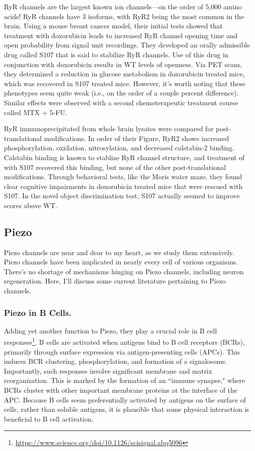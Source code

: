 RyR channels are the largest known ion channels---on the order of 5,000 amino acids! RyR channels have 3 isoforms, with RyR2 being the most common in the brain. Using a mouse breast cancer model, their initial tests showed that treatment with doxorubicin leads to increased RyR channel opening time and open probability from signal unit recordings. They developed an orally admissible drug called S107 that is said to stabilize RyR channels. Use of this drug in conjunction with doxorubicin results in WT levels of openness. Via PET scans, they determined a reduction in glucose metabolism in doxorubicin treated mice, which was recovered in S107 treated mice. However, it's worth noting that these phenotypes seem quite weak (i.e., on the order of a couple percent difference). Similar effects were observed with a second chemoterapeutic treatment course called MTX + 5-FU.\newline

RyR immunoprecipitated from whole brain lysates were compared for post-translational modifications. In order of their Figure, RyR2 shows increased phosphorylation, oxidation, nitrosylation, and decreased calstabin-2 binding. Calstabin binding is known to stablize RyR channel structure, and treatment of with S107 recovered this binding, but none of the other post-translational modifications. Through behavioral tests, like the Moris water maze, they found clear cognitive impairments in doxorubicin treated mice that were rescued with S107. In the novel object discrimination test, S107 actually seemed to improve scores above WT. 


\subsection{Piezo}

Piezo channels are near and dear to my heart, as we study them extensively. Piezo channels have been implicated in nearly every cell of various organisms. There's no shortage of mechanisms hinging on Piezo channels, including neuron regeneration. Here, I'll discuss some current literature pertaining to Piezo channels. 


\subsubsection{Piezo in B Cells.}

Adding yet another function to Piezo, they play a crucial role in B cell responses\footnote{\url{https://www.science.org/doi/10.1126/scisignal.abq5096}}. B cells are activated when antigens bind to B cell receptors (BCRs), primarily through surface expression via antigen-presenting cells (APCs). This induces BCR clustering, phosphorylation, and formation of a signalosome. Importantly, such responses involve significant membrane and matrix reorganization. This is marked by the formation of an ``immune synapse," where BCRs cluster with other important membrane proteins at the interface of the APC. Because B cells seem preferentially activated by antigens on the surface of cells, rather than soluble antigens, it is plausible that some physical interaction is beneficial to B cell activation.\newline

